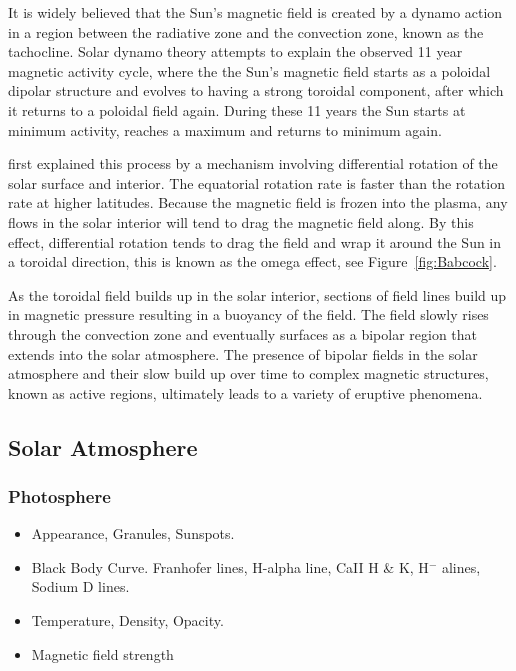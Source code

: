 It is widely believed that the Sun's magnetic field is created by a dynamo action in a region between the radiative zone and the convection zone, known as the tachocline. Solar dynamo theory attempts to explain the observed 11 year magnetic activity cycle, where the the Sun's magnetic field starts as a poloidal dipolar structure and evolves to having a strong toroidal component, after which it returns to a poloidal field again. During these 11 years the Sun starts at minimum activity, reaches a maximum and returns to minimum again.

\citet{babcock1961} first explained this process by a mechanism involving differential rotation of the solar surface and interior. The equatorial rotation rate is faster than the rotation rate at higher latitudes. Because the magnetic field is frozen into the plasma, any flows in the solar interior will tend to drag the magnetic field along. By this effect, differential rotation tends to drag the field and wrap it around the Sun in a toroidal direction, this is known as the omega effect, see Figure~\ref{fig:Babcock}.

As the toroidal field builds up in the solar interior, sections of field lines build up in magnetic pressure resulting in a buoyancy of the field. The field slowly rises through the convection zone and eventually surfaces as a bipolar region that extends into the solar atmosphere. The presence of bipolar fields in the solar atmosphere and their slow build up over time to complex magnetic structures, known as active regions, ultimately leads to a variety of eruptive phenomena.



\subsection{Solar Atmosphere}\label{sec:12}

\subsubsection{Photosphere}\label{sec:121}

\begin{itemize}
\item Appearance, Granules, Sunspots.
\item Black Body Curve. Franhofer lines, H-alpha line, CaII H \& K, H$^{-}$ alines, Sodium D lines. 
\item Temperature, Density, Opacity.
\item Magnetic field strength
\end{itemize}

